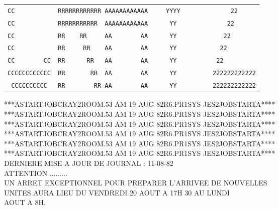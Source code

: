 {\begin{tabular}{l}
\texttt{CC\ \ \ \ \ \ \ \ \ \ \ \ RRRRRRRRRRRR\ AAAAAAAAAAAA\ \ \ \ \ YYYY\ \ \ \ \ \ \ \ \ \ \ \ \ \ 22}\\
\texttt{CC\ \ \ \ \ \ \ \ \ \ \ \ RRRRRRRRRRR\ \ AAAAAAAAAAAA\ \ \ \ \ \ YY\ \ \ \ \ \ \ \ \ \ \ \ \ \ 22}\\
\texttt{CC\ \ \ \ \ \ \ \ \ \ \ \ RR\ \ \ \ RR\ \ \ \ \ AA\ \ \ \ \ \ \ \ AA\ \ \ \ \ \ YY\ \ \ \ \ \ \ \ \ \ \ \ \ 22}\\
\texttt{CC\ \ \ \ \ \ \ \ \ \ \ \ RR\ \ \ \ \ RR\ \ \ \ AA\ \ \ \ \ \ \ \ AA\ \ \ \ \ \ YY\ \ \ \ \ \ \ \ \ \ \ \ 22}\\
\texttt{CC\ \ \ \ \ \ \ \ CC\ \ RR\ \ \ \ \ \ RR\ \ \ AA\ \ \ \ \ \ \ \ AA\ \ \ \ \ \ YY\ \ \ \ \ \ \ \ \ \ \ 22}\\
\texttt{CCCCCCCCCCCC\ \ RR\ \ \ \ \ \ \ RR\ \ AA\ \ \ \ \ \ \ \ AA\ \ \ \ \ \ YY\ \ \ \ \ \ \ \ \ \ 222222222222}\\
\texttt{\ CCCCCCCCCC\ \ \ RR\ \ \ \ \ \ \ \ RR\ AA\ \ \ \ \ \ \ \ AA\ \ \ \ \ \ YY\ \ \ \ \ \ \ \ \ \ 222222222222}\\
\end{tabular}}
{\ttfamily ****A\quad START\quad JOB\quad CRAY2\quad ROOM.53 AM 19 AUG 82\quad R6.PR1\quad SYS JES2\quad JOB\quad START\quad A****}\\
{\ttfamily ****A\quad START\quad JOB\quad CRAY2\quad ROOM.53 AM 19 AUG 82\quad R6.PR1\quad SYS JES2\quad JOB\quad START\quad A****}\\
{\ttfamily ****A\quad START\quad JOB\quad CRAY2\quad ROOM.53 AM 19 AUG 82\quad R6.PR1\quad SYS JES2\quad JOB\quad START\quad A****}\\
{\ttfamily ****A\quad START\quad JOB\quad CRAY2\quad ROOM.53 AM 19 AUG 82\quad R6.PR1\quad SYS JES2\quad JOB\quad START\quad A****}\\
{\ttfamily ****A\quad START\quad JOB\quad CRAY2\quad ROOM.53 AM 19 AUG 82\quad R6.PR1\quad SYS JES2\quad JOB\quad START\quad A****}\\
{\ttfamily ****A\quad START\quad JOB\quad CRAY2\quad ROOM.53 AM 19 AUG 82\quad R6.PR1\quad SYS JES2\quad JOB\quad START\quad A****}\\
{\ttfamily
DERNIERE MISE A JOUR DE JOURNAL : 11-08-82\\
ATTENTION .........\\
\qquad UN ARRET EXCEPTIONNEL POUR PREPARER L'ARRIVEE DE NOUVELLES\\
\qquad UNITES AURA LIEU DU VENDREDI 20 AOUT A 17H 30 AU LUNDI\\
 AOUT A 8H.}
